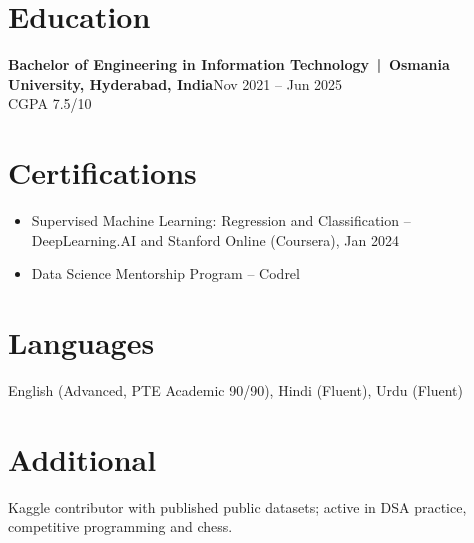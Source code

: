 \documentclass[10pt,a4paper]{article}
\newcommand{\entry}[2]{\textbf{#1}\hfill #2\\[-2pt]}
\begin{document}
\section{Education}
\entry{Bachelor of Engineering in Information Technology \,|\, Osmania University, Hyderabad, India}{Nov 2021 -- Jun 2025}
CGPA 7.5/10

\section{Certifications}
\begin{itemize}
  \item Supervised Machine Learning: Regression and Classification -- DeepLearning.AI and Stanford Online (Coursera), Jan 2024
  \item Data Science Mentorship Program -- Codrel
\end{itemize}

\section{Languages}
English (Advanced, PTE Academic 90/90), Hindi (Fluent), Urdu (Fluent)

\section{Additional}
Kaggle contributor with published public datasets; active in DSA practice, competitive programming and chess.
\end{document}
